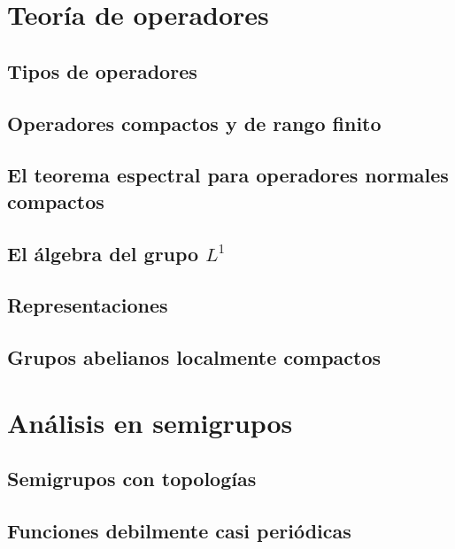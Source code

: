 \documentclass[12pt,]{krantz}
\theoremstyle{definition}
\theoremstyle{definition}
\theoremstyle{definition}
\theoremstyle{remark}
\begin{document}
\chapter{Teoría de operadores}\label{teoria-de-operadores}

\section{Tipos de operadores}\label{tipos-de-operadores}

\section{Operadores compactos y de rango
finito}\label{operadores-compactos-y-de-rango-finito}

\section{El teorema espectral para operadores normales
compactos}\label{el-teorema-espectral-para-operadores-normales-compactos}

\section{\texorpdfstring{El álgebra del grupo
\(L^1\)}{El álgebra del grupo L\^{}1}}\label{el-algebra-del-grupo-l1}

\section{Representaciones}\label{representaciones}

\section{Grupos abelianos localmente
compactos}\label{grupos-abelianos-localmente-compactos}

\chapter{Análisis en semigrupos}\label{analisis-en-semigrupos}

\section{Semigrupos con topologías}\label{semigrupos-con-topologias}

\section{Funciones debilmente casi
periódicas}\label{funciones-debilmente-casi-periodicas}
\end{document}
